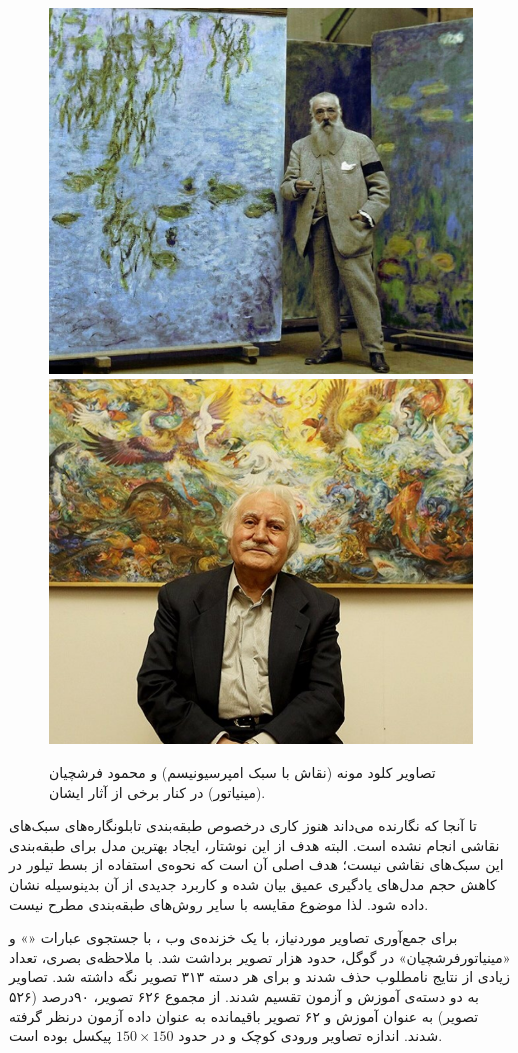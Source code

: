 \documentclass[11pt, twoside]{imsproc}
\let\LTRfootnote\footnoteA
\begin{document}
\begin{figure}[t]
\centering
\includegraphics[width=.39\linewidth]{images/Claude-Monte.jpg}
\includegraphics[width=.39\linewidth]{images/Mahmood-Farshchian.jpg}
\caption{
تصاویر کلود مونه (نقاش با سبک امپرسیونیسم) و محمود فرشچیان (مینیاتور) در کنار برخی از آثار ایشان.
}
\label{fig:MF-images}
\end{figure}

تا آنجا که نگارنده می‌داند هنوز کاری درخصوص طبقه‌بندی تابلونگاره‌های سبک‌های نقاشی انجام نشده است.
 البته
هدف از این نوشتار، ایجاد بهترین مدل برای طبقه‌بندی این سبک‌های نقاشی نیست؛
هدف اصلی آن است که نحوه‌ی استفاده از بسط تیلور در کاهش حجم مدل‌های یادگیری عمیق بیان شده و کاربرد جدیدی از آن بدینوسیله نشان داده شود.
لذا موضوع مقایسه با سایر روش‌های طبقه‌بندی مطرح نیست.

برای جمع‌آوری تصاویر موردنیاز، با یک خزنده‌ی وب%
\LTRfootnote{Web Crawler}، 
با جستجوی عبارات
«»
 و «مینیاتور‌فرشچیان» در گوگل، حدود هزار تصویر برداشت شد.
با ملاحظه‌ی بصری، تعداد زیادی از نتایج نامطلوب حذف شدند
 و برای هر دسته ۳۱۳ تصویر نگه داشته شد.
تصاویر به دو دسته‌ی آموزش و آزمون تقسیم شدند.
از مجموع ۶۲۶ تصویر، ۹۰درصد (۵۲۶ تصویر) به عنوان آموزش و ۶۲ تصویر باقیمانده  به عنوان داده آزمون درنظر گرفته شدند.
اندازه تصاویر ورودی کوچک و در حدود
$150\times150$
پیکسل بوده است.
\end{document}
